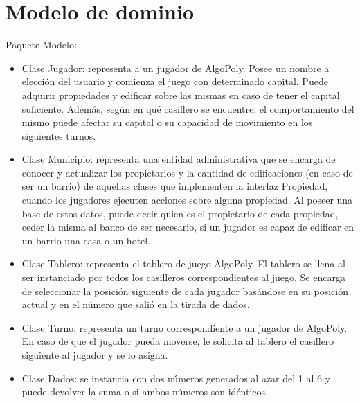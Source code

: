 \documentclass[titlepage,a4paper]{article}
\begin{document}
\section{Modelo de dominio}\label{sec:modelo}

Paquete Modelo:

\begin{itemize}
\item 
Clase Jugador: representa a un jugador de AlgoPoly. Posee un nombre a elección del usuario y comienza el juego con determinado capital. Puede adquirir propiedades y edificar sobre las mismas en caso de tener el capital suficiente. Además, según en qué casillero se encuentre, el comportamiento del mismo puede afectar su capital o su capacidad de movimiento en los siguientes turnos.
\end{itemize}

\begin{itemize}
\item 
Clase Municipio: representa una entidad administrativa que se encarga de conocer y actualizar los propietarios y la cantidad de edificaciones (en caso de ser un barrio) de aquellas clases que implementen la interfaz Propiedad, cuando los jugadores ejecuten acciones sobre alguna propiedad. Al poseer una base de estos datos, puede decir quien es el propietario de cada propiedad, ceder la misma al banco de ser necesario, si un jugador es capaz de edificar en un barrio una casa o un hotel.
\end{itemize}

\begin{itemize}
\item 
Clase Tablero: representa el tablero de juego AlgoPoly. El tablero se llena al ser instanciado por todos los casilleros correspondientes al juego. Se encarga de seleccionar la posición siguiente de cada jugador basándose en su posición actual y en el número que salió en la tirada de dados.
\end{itemize}

\begin{itemize}
\item 
Clase Turno: representa un turno correspondiente a un jugador de AlgoPoly. En caso de que el jugador pueda moverse, le solicita al tablero el casillero siguiente al jugador y se lo asigna.
\end{itemize}

\begin{itemize}
\item 
Clase Dados: se instancia con dos números generados al azar del 1 al 6 y puede devolver la suma o si ambos números son idénticos.
\end{itemize}
\end{document}
